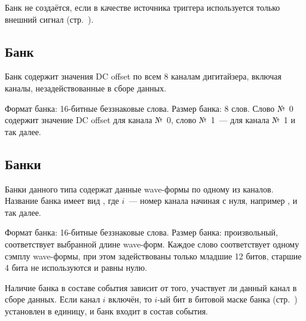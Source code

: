 Банк не создаётся, если в качестве источника триггера используется только внешний сигнал (стр.~\pageref{sec-v1720-trigger}).

\subsection{Банк }

Банк содержит значения DC offset \cite{CaenUM3051AIS} по всем 8 каналам дигитайзера, включая каналы, незадействованные в сборе данных.

Формат банка: 16-битные беззнаковые слова. Размер банка: 8 слов. Слово №~0 содержит значение DC offset для канала №~0, слово №~1~--- для канала №~1 и так далее.

\subsection{Банки }

Банки данного типа  содержат данные wave-формы по одному из каналов. Название банка имеет вид , где $i$~--- номер канала начиная с нуля, например ,  и так далее.

Формат банка: 16-битные беззнаковые слова. Размер банка: произвольный, соответствует выбранной длине wave-форм. Каждое слово соответствует одному сэмплу wave-формы, при этом задействованы только младшие 12 битов, старшие 4 бита не используются и равны нулю.

Наличие банка в составе события зависит от того, участвует ли данный канал в сборе данных. Если канал $i$ включён, то $i$-ый бит в битовой маске банка  (стр.~\pageref{sec_bank_info}) установлен в единицу, и банк  входит в состав события.







